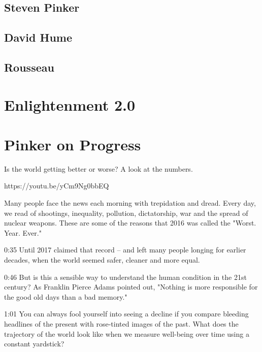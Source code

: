 \documentclass[10pt,titlepage]{article}
\begin{document}
\subsection{Steven Pinker}

\subsection{David Hume}

\subsection{Rousseau}

\section{Enlightenment 2.0}

\appendix

\section{Pinker on Progress}

Is the world getting better or worse? A look at the numbers.

https://youtu.be/yCm9Ng0bbEQ


Many people face the news each morning
with trepidation and dread.
Every day, we read of shootings,
inequality, pollution, dictatorship,
war and the spread of nuclear weapons.
These are some of the reasons
that 2016 was called the "Worst. Year. Ever."

0:35
Until 2017 claimed that record --
and left many people longing for earlier decades,
when the world seemed safer, cleaner and more equal.

0:46
But is this a sensible way to understand the human condition
in the 21st century?
As Franklin Pierce Adams pointed out,
"Nothing is more responsible for the good old days
than a bad memory."

1:01
You can always fool yourself into seeing a decline
if you compare bleeding headlines of the present
with rose-tinted images of the past.
What does the trajectory of the world look like
when we measure well-being over time using a constant yardstick?
\end{document}
